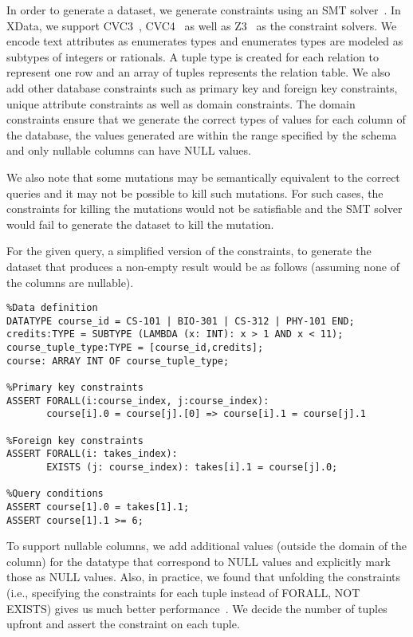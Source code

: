In order to generate a dataset, we generate constraints using an SMT solver~\cite{smt}. In XData, we support CVC3~\cite{CVC3}, CVC4~\cite{CVC4} as well as Z3~\cite{z3} as the constraint solvers. We encode text attributes as enumerates types and enumerates types are modeled as subtypes of integers or rationals. A tuple type is created for each relation to represent one row and an array of tuples represents the relation table. We also add other database constraints such as primary key and foreign key constraints, unique attribute constraints as well as domain constraints. The domain constraints ensure that we generate the correct types of values for each column of the database, the values generated are within the range specified by the schema and only nullable columns can have NULL values.



We also note that some mutations may be semantically equivalent to the correct queries and it may not be possible to kill such mutations. For such cases, the constraints for killing the mutations would not be satisfiable and the SMT solver would fail to generate the dataset to kill the mutation.

For the given query, a simplified version of the constraints, to generate the dataset that produces a non-empty result would be as follows (assuming none of the columns are nullable).
\begin{verbatim}
%Data definition
DATATYPE course_id = CS-101 | BIO-301 | CS-312 | PHY-101 END;
credits:TYPE = SUBTYPE (LAMBDA (x: INT): x > 1 AND x < 11);
course_tuple_type:TYPE = [course_id,credits];
course: ARRAY INT OF course_tuple_type;

%Primary key constraints
ASSERT FORALL(i:course_index, j:course_index): 
       course[i].0 = course[j].[0] => course[i].1 = course[j].1

%Foreign key constraints
ASSERT FORALL(i: takes_index):
       EXISTS (j: course_index): takes[i].1 = course[j].0;

%Query conditions
ASSERT course[1].0 = takes[1].1;
ASSERT course[1].1 >= 6;
\end{verbatim}

To support nullable columns, we add additional values (outside the domain of the column) for the datatype that correspond to NULL values and explicitly mark those as NULL values. 
Also, in practice, we found that unfolding the constraints (i.e., specifying the constraints for each tuple instead of FORALL, NOT EXISTS) gives us much better performance~\cite{xdata:icde11}. We decide the number of tuples upfront and assert the constraint on each tuple. 

